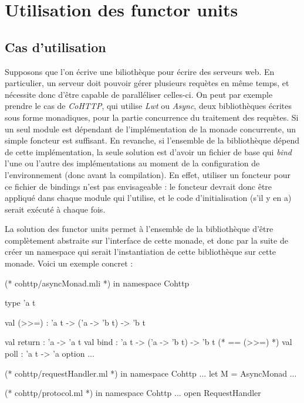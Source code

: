 \documentclass[11pt,a4paper]{report}
\begin{document}
\section{Utilisation des functor units}

\subsection{Cas d'utilisation}

Supposons que l'on écrive une biliothèque pour écrire des serveurs web. En
particulier, un serveur doit pouvoir gérer plusieurs requètes en même temps, et
nécessite donc d'être capable de paralléliser celles-ci. On peut par exemple
prendre le cas de \emph{CoHTTP}, qui utilise \emph{Lwt} ou \emph{Async}, deux
bibliothèques écrites sous forme monadiques, pour la partie concurrence du
traitement des requètes. Si un seul module est dépendant de l'implémentation de
la monade concurrente, un simple foncteur est suffisant. En revanche, si
l'ensemble de la bibliothèque dépend de cette implémentation, la seule solution
est d'avoir un fichier de base qui \emph{bind} l'une ou l'autre des
implémentations au moment de la configuration de l'environnement (donc avant la
compilation). En effet, utiliser un foncteur pour ce fichier de bindings n'est
pas envisageable : le foncteur devrait donc être appliqué dans chaque module qui
l'utilise, et le code d'initialisation (s'il y en a) serait exécuté à chaque
fois.

La solution des functor units permet à l'ensemble de la bibliothèque d'être
complètement abstraite sur l'interface de cette monade, et donc par la suite de
créer un namespace qui serait l'instantiation de cette bibliothèque sur cette
monade. Voici un exemple concret :

\begin{OCaml}
(* cohttp/asyncMonad.mli *)
in namespace Cohttp

type 'a t

val (>>=) : 'a t -> ('a -> 'b t) -> 'b t

val return : 'a -> 'a t
val bind : 'a t -> ('a -> 'b t) -> 'b t (* == (>>=) *)
val poll : 'a t -> 'a option
...
\end{OCaml}

\begin{OCaml}
(* cohttp/requestHandler.ml *)
in namespace Cohttp
...
let M = AsyncMonad
...
\end{OCaml}

\begin{OCaml}
(* cohttp/protocol.ml *)
in namespace Cohttp
...
open RequestHandler
\end{OCaml}
\end{document}
